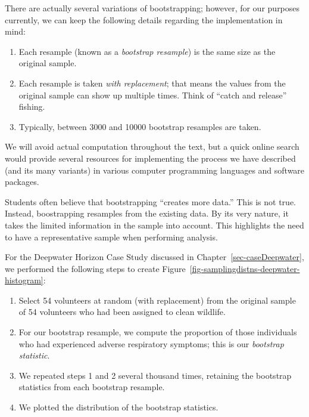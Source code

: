 \documentclass[
  letterpaper,
  DIV=11,
  numbers=noendperiod]{scrreprt}
\providecommand{\tightlist}{%
  \setlength{\itemsep}{0pt}\setlength{\parskip}{0pt}}\usepackage{longtable,booktabs,array}
\theoremstyle{definition}
\theoremstyle{definition}
\theoremstyle{plain}
\theoremstyle{remark}
\begin{document}
There are actually several variations of bootstrapping; however, for our
purposes currently, we can keep the following details regarding the
implementation in mind:

\begin{enumerate}
\def\labelenumi{\arabic{enumi}.}
\tightlist
\item
  Each resample (known as a \emph{bootstrap resample}) is the same size
  as the original sample.
\item
  Each resample is taken \emph{with replacement}; that means the values
  from the original sample can show up multiple times. Think of ``catch
  and release'' fishing.
\item
  Typically, between 3000 and 10000 bootstrap resamples are taken.
\end{enumerate}

We will avoid actual computation throughout the text, but a quick online
search would provide several resources for implementing the process we
have described (and its many variants) in various computer programming
languages and software packages.

\begin{tcolorbox}[enhanced jigsaw, colbacktitle=quarto-callout-tip-color!10!white, colback=white, left=2mm, title=\textcolor{quarto-callout-tip-color}{\faLightbulb}\hspace{0.5em}{Big Idea}, toptitle=1mm, leftrule=.75mm, breakable, bottomrule=.15mm, arc=.35mm, rightrule=.15mm, toprule=.15mm, coltitle=black, opacityback=0, colframe=quarto-callout-tip-color-frame, opacitybacktitle=0.6, bottomtitle=1mm, titlerule=0mm]

Students often believe that bootstrapping ``creates more data.'' This is
not true. Instead, boostrapping resamples from the existing data. By its
very nature, it takes the limited information in the sample into
account. This highlights the need to have a representative sample when
performing analysis.

\end{tcolorbox}

For the Deepwater Horizon Case Study discussed in
Chapter~\ref{sec-caseDeepwater}, we performed the following steps to
create Figure~\ref{fig-samplingdistns-deepwater-histogram}:

\begin{enumerate}
\def\labelenumi{\arabic{enumi}.}
\tightlist
\item
  Select 54 volunteers at random (with replacement) from the original
  sample of 54 volunteers who had been assigned to clean wildlife.
\item
  For our bootstrap resample, we compute the proportion of those
  individuals who had experienced adverse respiratory symptoms; this is
  our \emph{bootstrap statistic}.
\item
  We repeated steps 1 and 2 several thousand times, retaining the
  bootstrap statistics from each bootstrap resample.
\item
  We plotted the distribution of the bootstrap statistics.
\end{enumerate}
\end{document}
